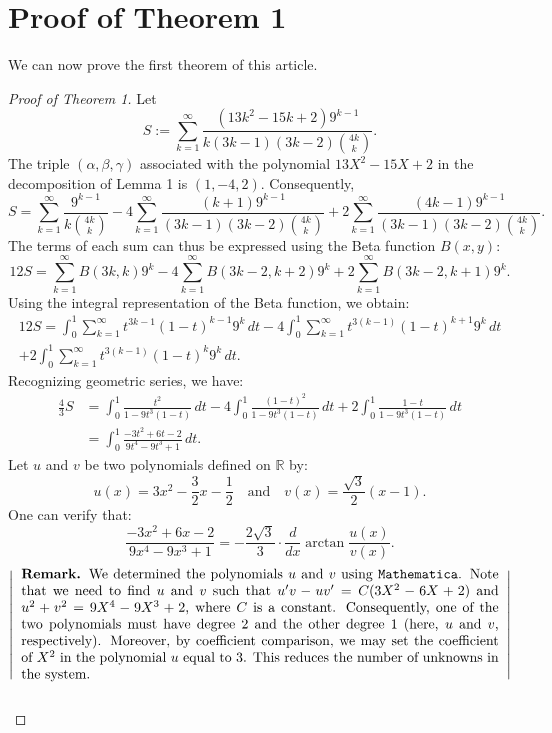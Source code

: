 \documentclass{amsart}
\numberwithin{equation}{section}
\newcommand{\R}{\mathbb R}
\begin{document}
\section{Proof of Theorem 1}
We can now prove the first theorem of this article.
\begin{proof}[Proof of Theorem 1]
    Let
    \[S:=\sum_{k=1}^\infty \frac{(13k^2-15k+2)9^{k-1}}{k(3k-1)(3k-2)\binom{4k}{k}}.\]
    The triple $(\alpha,\beta,\gamma)$ associated with the polynomial $13X^2-15X+2$ in the decomposition of Lemma 1 is $(1,-4,2)$. Consequently,
    \[S=\sum_{k=1}^\infty \frac{9^{k-1}}{k\binom{4k}{k}}-4\sum_{k=1}^\infty \frac{(k+1)9^{k-1}}{(3k-1)(3k-2)\binom{4k}{k}}+2\sum_{k=1}^\infty \frac{(4k-1)9^{k-1}}{(3k-1)(3k-2)\binom{4k}{k}}.\]
    The terms of each sum can thus be expressed using the Beta function $B(x,y)$:
    \[12S=\sum_{k=1}^\infty B(3k,k)9^k-4\sum_{k=1}^\infty B(3k-2,k+2)9^k+2\sum_{k=1}^\infty B(3k-2,k+1)9^k.\]
    Using the integral representation of the Beta function, we obtain:
    \begin{multline*}
        12S=\int_0^1\sum_{k=1}^\infty t^{3k-1}(1-t)^{k-1}9^k\,dt-4\int_0^1\sum_{k=1}^\infty t^{3(k-1)}(1-t)^{k+1}9^k\,dt\\+2\int_0^1\sum_{k=1}^\infty t^{3(k-1)}(1-t)^k9^k\,dt.
    \end{multline*}
    Recognizing geometric series, we have:
    \begin{align}
        \frac43S&=\int_0^1\frac{t^2}{1-9t^3(1-t)}\,dt-4\int_0^1\frac{(1-t)^2}{1-9t^3(1-t)}\,dt+2\int_0^1\frac{1-t}{1-9t^3(1-t)}\,dt\nonumber
        \\&=\int_0^1\frac{-3t^2+6t-2}{9t^4-9t^3+1}\,dt.
        \label{S=Int}
    \end{align}
    Let $u$ and $v$ be two polynomials defined on $\R$ by:
    \[u(x)=3x^2-\frac32x-\frac12\quad\text{and}\quad v(x)=\frac{\sqrt3}{2}(x-1).\]
    One can verify that:
    \begin{equation}
    \frac{-3x^2+6x-2}{9x^4-9x^3+1}=-\frac{2\sqrt3}{3}\cdot\frac{d}{dx}\arctan{\frac{u(x)}{v(x)}}.
    \label{d/dx atan u/v}
    \end{equation}
    \[
    \left|
    \hspace{0.2cm}
    \begin{minipage}{\textwidth}
    \textbf{Remark.} We determined the polynomials $u$ and $v$ using \texttt{Mathematica}. Note that we need to find $u$ and $v$ such that $u'v-uv'=C(3X^2-6X+2)$ and $u^2+v^2=9X^4-9X^3+2$, where $C$ is a constant. Consequently, one of the two polynomials must have degree $2$ and the other degree $1$ (here, $u$ and $v$, respectively). Moreover, by coefficient comparison, we may set the coefficient of $X^2$ in the polynomial $u$ equal to $3$. This reduces the number of unknowns in the system.
    \end{minipage}
    \hspace{0.2cm}
    \right|
    \]\\
 

\end{proof}
\end{document}
